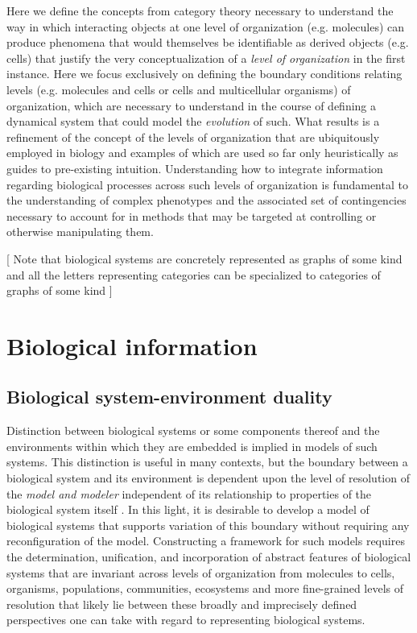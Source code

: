 \documentclass[aps,twocolumn]{revtex4}
\begin{document}
Here we define the concepts from category theory necessary to understand the way in which interacting objects at one level of organization (e.g. molecules) can produce phenomena that would themselves be identifiable as derived objects (e.g. cells) that justify the very conceptualization of a \emph{level of organization} in the first instance. Here we focus exclusively on defining the boundary conditions relating levels (e.g. molecules and cells or cells and multicellular organisms) of organization, which are necessary to understand in the course of defining a dynamical system that could model the \emph{evolution} of such. What results is a refinement of the concept of the levels of organization that are ubiquitously employed in biology and examples of which are used so far only heuristically as guides to pre-existing intuition. Understanding how to integrate information regarding biological processes across such levels of organization is fundamental to the understanding of complex phenotypes and the associated set of contingencies necessary to account for in methods that may be targeted at controlling or otherwise manipulating them.

[ Note that biological systems are concretely represented as graphs of some kind and all the letters representing categories can be specialized to categories of graphs of some kind ]

\section{Biological information}
\subsection{Biological system-environment duality}
Distinction between biological systems or some components thereof and the environments within which they are embedded is implied in models of such systems. This distinction is useful in many contexts, but the boundary between a biological system and its environment is dependent upon the level of resolution of the \emph{model and modeler} independent of its relationship to properties of the biological system itself \cite{Fontana1996}. In this light, it is desirable to develop a model of biological systems that supports variation of this boundary without requiring any reconfiguration of the model. Constructing a framework for such models requires the determination, unification, and incorporation of abstract features of biological systems that are invariant across levels of organization from molecules to cells, organisms, populations, communities, ecosystems and more fine-grained levels of resolution that likely lie between these broadly and imprecisely defined perspectives one can take with regard to representing biological systems.
\end{document}
